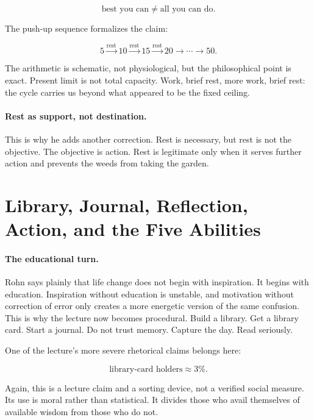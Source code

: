 \begin{equation}
\text{best you can} \neq \text{all you can do}.
\end{equation}

The push-up sequence formalizes the claim:

\begin{equation}
5 \xrightarrow{\text{rest}} 10 \xrightarrow{\text{rest}} 15 \xrightarrow{\text{rest}} 20 \to \cdots \to 50.
\end{equation}

The arithmetic is schematic, not physiological, but the philosophical point is exact. Present limit is not total capacity. Work, brief rest, more work, brief rest: the cycle carries us beyond what appeared to be the fixed ceiling.

\paragraph{Rest as support, not destination.}
This is why he adds another correction. Rest is necessary, but rest is not the objective. The objective is action. Rest is legitimate only when it serves further action and prevents the weeds from taking the garden.

\section{Library, Journal, Reflection, Action, and the Five Abilities}

\paragraph{The educational turn.}
Rohn says plainly that life change does not begin with inspiration. It begins with education. Inspiration without education is unstable, and motivation without correction of error only creates a more energetic version of the same confusion. This is why the lecture now becomes procedural. Build a library. Get a library card. Start a journal. Do not trust memory. Capture the day. Read seriously.

One of the lecture's more severe rhetorical claims belongs here:

\begin{equation}
\text{library-card holders} \approx 3\%.
\end{equation}

Again, this is a lecture claim and a sorting device, not a verified social measure. Its use is moral rather than statistical. It divides those who avail themselves of available wisdom from those who do not.

